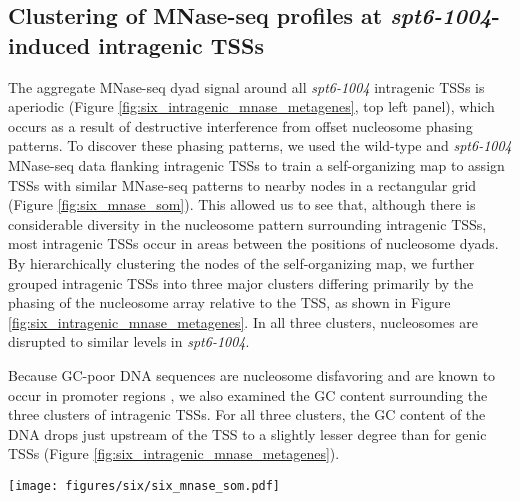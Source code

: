 \clearpage
\subsection{Clustering of MNase-seq profiles at \textit{spt6-1004}-induced intragenic TSSs}

The aggregate MNase-seq dyad signal around all \textit{spt6-1004} intragenic TSSs is aperiodic (Figure \ref{fig:six_intragenic_mnase_metagenes}, top left panel), which occurs as a result of destructive interference from offset nucleosome phasing patterns.
To discover these phasing patterns, we used the wild-type and \textit{spt6-1004} MNase-seq data flanking intragenic TSSs to train a self-organizing map to assign TSSs with similar MNase-seq patterns to nearby nodes in a rectangular grid (Figure \ref{fig:six_mnase_som}).
This allowed us to see that, although there is considerable diversity in the nucleosome pattern surrounding intragenic TSSs, most intragenic TSSs occur in areas between the positions of nucleosome dyads.
By hierarchically clustering the nodes of the self-organizing map, we further grouped intragenic TSSs into three major clusters differing primarily by the phasing of the nucleosome array relative to the TSS, as shown in Figure \ref{fig:six_intragenic_mnase_metagenes}.
In all three clusters, nucleosomes are disrupted to similar levels in \textit{spt6-1004}.

Because GC-poor DNA sequences are nucleosome disfavoring and are known to occur in promoter regions \citep{iyer1995,kaplan2008,tillo2009,zhang2009}, we also examined the GC content surrounding the three clusters of intragenic TSSs.
For all three clusters, the GC content of the DNA drops just upstream of the TSS to a slightly lesser degree than for genic TSSs (Figure \ref{fig:six_intragenic_mnase_metagenes}).

\begin{sidewaysfigure}
    \centering
    \texttt{[image: figures/six/six\_mnase\_som.pdf]}
    \caption[Average MNase-seq dyad signal around all \textit{spt6-1004}-induced intragenic TSSs, grouped by a self-organizing map of the MNase-seq signal.]{Average MNase-seq dyad signal around all \textit{spt6-1004}-induced intragenic TSSs, grouped by assignment to nodes of a 6x8 super-organizing map (SOM). The number of TSSs assigned to each node is shown in the upper right of each panel, and is shaded by the node's assignment to a cluster determined by agglomerative hierarchical clustering of the nodes. The solid line and shading are the median and inter-quartile range of the mean spike-in normalized coverage over two replicates (\textit{spt6-1004}) or one experiment (wild-type), in non-overlapping 5 bp bins.}
    \label{fig:six_mnase_som}
\end{sidewaysfigure}

